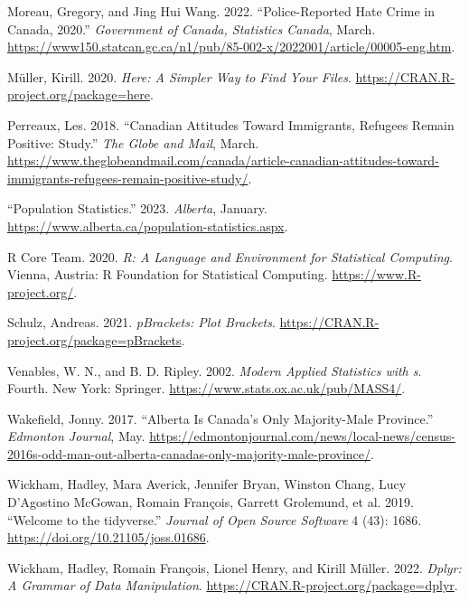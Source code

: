 \documentclass[
]{article}
\newlength{\cslhangindent}
\newlength{\cslentryspacingunit} %
\newenvironment{CSLReferences}[2] %
 {%
  \setlength{\parindent}{0pt}
  \ifodd #1
  \let\oldpar\par
  \def\par{\hangindent=\cslhangindent\oldpar}
  \fi
  \setlength{\parskip}{#2\cslentryspacingunit}
 }%
 {}
\begin{document}
\begin{CSLReferences}{1}{0}
\leavevmode{}%
Moreau, Gregory, and Jing Hui Wang. 2022. {``Police-Reported Hate Crime
in Canada, 2020.''} \emph{Government of Canada, Statistics Canada},
March.
\url{https://www150.statcan.gc.ca/n1/pub/85-002-x/2022001/article/00005-eng.htm}.

\leavevmode{}%
Müller, Kirill. 2020. \emph{Here: A Simpler Way to Find Your Files}.
\url{https://CRAN.R-project.org/package=here}.

\leavevmode{}%
Perreaux, Les. 2018. {``Canadian Attitudes Toward Immigrants, Refugees
Remain Positive: Study.''} \emph{The Globe and Mail}, March.
\url{https://www.theglobeandmail.com/canada/article-canadian-attitudes-toward-immigrants-refugees-remain-positive-study/}.

\leavevmode{}%
{``Population Statistics.''} 2023. \emph{Alberta}, January.
\url{https://www.alberta.ca/population-statistics.aspx}.

\leavevmode{}%
R Core Team. 2020. \emph{R: A Language and Environment for Statistical
Computing}. Vienna, Austria: R Foundation for Statistical Computing.
\url{https://www.R-project.org/}.

\leavevmode{}%
Schulz, Andreas. 2021. \emph{pBrackets: Plot Brackets}.
\url{https://CRAN.R-project.org/package=pBrackets}.

\leavevmode{}%
Venables, W. N., and B. D. Ripley. 2002. \emph{Modern Applied Statistics
with s}. Fourth. New York: Springer.
\url{https://www.stats.ox.ac.uk/pub/MASS4/}.

\leavevmode{}%
Wakefield, Jonny. 2017. {``Alberta Is Canada's Only Majority-Male
Province.''} \emph{Edmonton Journal}, May.
\url{https://edmontonjournal.com/news/local-news/census-2016s-odd-man-out-alberta-canadas-only-majority-male-province/}.

\leavevmode{}%
Wickham, Hadley, Mara Averick, Jennifer Bryan, Winston Chang, Lucy
D'Agostino McGowan, Romain François, Garrett Grolemund, et al. 2019.
{``Welcome to the {tidyverse}.''} \emph{Journal of Open Source Software}
4 (43): 1686. \url{https://doi.org/10.21105/joss.01686}.

\leavevmode{}%
Wickham, Hadley, Romain François, Lionel Henry, and Kirill Müller. 2022.
\emph{Dplyr: A Grammar of Data Manipulation}.
\url{https://CRAN.R-project.org/package=dplyr}.


\end{CSLReferences}
\end{document}
